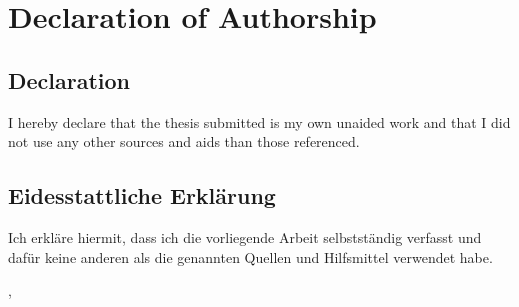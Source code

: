 \chapter{Declaration of Authorship} 

\section*{Declaration} 

I hereby declare that the thesis submitted is my own unaided work and that I did not use any other sources and aids than those referenced.

\bigskip\bigskip

\section*{Eidesstattliche Erklärung}

Ich erkläre hiermit, dass ich die vorliegende Arbeit selbstständig verfasst und dafür keine anderen als die genannten Quellen und Hilfsmittel verwendet habe.

\bigskip\bigskip\bigskip\bigskip




\begin{minipage}{6cm}
\docCity{}, \docDate
\bigskip\bigskip\bigskip


\hrulefill

\small{\docAuthor}
\end{minipage}